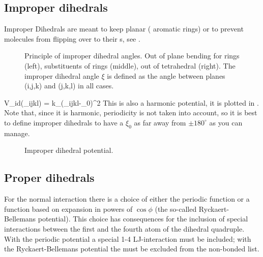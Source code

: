 \newcommand{\rvkj}{{\bf r}_{kj}}
\newcommand{\rkj}{r_{kj}}

\subsection{Improper dihedrals}
Improper Dihedrals are meant to keep  planar ({\eg} 
aromatic rings) or to prevent molecules from flipping over to their
s, see .

\begin {figure}
\centerline{\hspace{1cm}
\hspace{1cm}}
\caption[Improper dihedral angles.]{Principle of improper
dihedral angles. Out of plane bending for rings (left), substituents
of rings (middle), out of tetrahedral (right). The improper dihedral
angle $\xi$ is defined as the angle between planes (i,j,k) and (j,k,l)
in all cases.}
\label{fig:imp}
\end {figure}

\beq
V_{id}(\xi_{ijkl}) = k_{\xi}(\xi_{ijkl}-\xi_0)^2
\eeq
This is also a harmonic potential, it is plotted in
. Note that, since it is harmonic, periodicity is
not taken into account, so it is best to define improper dihedrals
to have a $\xi_0$ as far away from $\pm 180^\circ$ as you can manage.

\begin{figure}
\centerline{}
\caption{Improper dihedral potential.}
\label{fig:imps}
\end{figure}

\subsection{Proper dihedrals}
For the normal  interaction there is a choice of either the
{\gromos} periodic function or a function based on expansion in powers of
$\cos \phi$ (the so-called Ryckaert-Bellemans potential). This choice
has consequences for the inclusion of special interactions between the
first and the fourth atom of the dihedral quadruple. With the periodic
{\gromos} potential a special 1-4 LJ-interaction must be included; with
the Ryckaert-Bellemans potential the  
must be excluded from the non-bonded list.  

